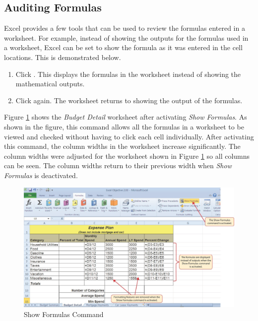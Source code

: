 \subsection{Auditing Formulas}

Excel provides a few tools that can be used to review the formulas entered in a worksheet. For example, instead of showing the outputs for the formulas used in a worksheet, Excel can be set to show the formula as it was entered in the cell locations. This is demonstrated below.

\begin{enumbox}
	\begin{enumerate}
		\item Click . This displays the formulas in the worksheet instead of showing the mathematical outputs.
		\item Click  again. The worksheet returns to showing the output of the formulas.
	\end{enumerate}
\end{enumbox}

Figure \ref{02:fig08} shows the \textit{Budget Detail} worksheet after activating \textit{Show Formulas}. As shown in the figure, this command allows all the formulas in a worksheet to be viewed and checked without having to click each cell individually. After activating this command, the column widths in the worksheet increase significantly. The column widths were adjusted for the worksheet shown in Figure \ref{02:fig08} so all columns can be seen. The column widths return to their previous width when \textit{Show Formulas} is deactivated.

\begin{figure}[H]
	\centering
	\includegraphics[width=\maxwidth{.95\linewidth}]{gfx/ch02_fig08}
	\caption{Show Formulas Command}
	\label{02:fig08}
\end{figure}

